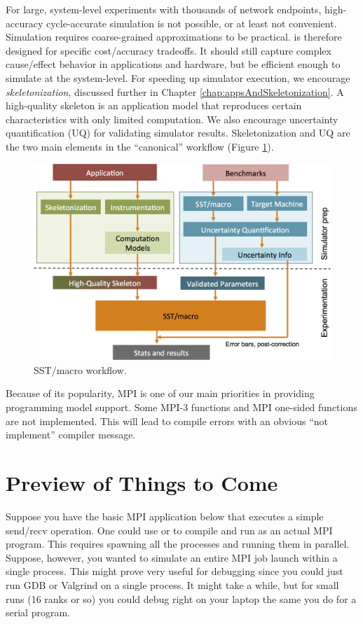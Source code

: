 For large, system-level experiments with thousands of network endpoints, high-accuracy cycle-accurate simulation is not possible,
or at least not convenient.
Simulation requires coarse-grained approximations to be practical.
\sstmacro is therefore designed for specific cost/accuracy tradeoffs.
It should still capture complex cause/effect behavior in applications and hardware, but be efficient enough to simulate at the system-level. 
For speeding up simulator execution, we encourage \textit{skeletonization}, discussed further in Chapter \ref{chap:appsAndSkeletonization}. 
A high-quality skeleton is an application model that reproduces certain characteristics with only limited computation.  
We also encourage uncertainty quantification (UQ) for validating simulator results.
Skeletonization and UQ are the two main elements in the ``canonical'' \sstmacro workflow (Figure \ref{fig:workflow}).

\begin{figure}[t]
  \centering
    \includegraphics[width=0.99\columnwidth]{figures/workflow.png}
      \caption{SST/macro workflow.}
      \label{fig:workflow}
\end{figure}

Because of its popularity, MPI is one of our main priorities in providing programming model support.  
Some MPI-3 functions and MPI one-sided functions are not implemented.
This will lead to compile errors with an obvious ``not implement'' compiler message.

\section{Preview of Things to Come}
Suppose you have the basic MPI application below that executes a simple send/recv operation.
One could use  or  to compile and run as an actual MPI program.
This requires spawning all the processes and running them in parallel.
Suppose, however, you wanted to simulate an entire MPI job launch within a single process.
This might prove very useful for debugging since you could just run GDB or Valgrind on a single process.
It might take a while, but for small runs (16 ranks or so) you could debug right on your laptop the same you do for a serial program.

